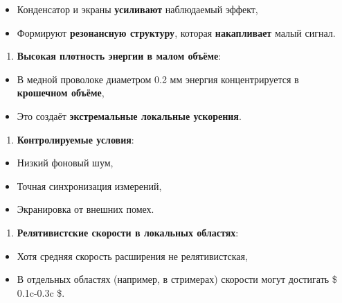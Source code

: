 \documentclass[11pt]{article}
\providecommand{\tightlist}{%
      \setlength{\itemsep}{0pt}\setlength{\parskip}{0pt}}
\begin{document}
\begin{itemize}
\tightlist
\item
  Конденсатор и экраны \textbf{усиливают} наблюдаемый эффект,\\
\item
  Формируют \textbf{резонансную структуру}, которая \textbf{накапливает}
  малый сигнал.
\end{itemize}

\begin{enumerate}
\def\labelenumi{\arabic{enumi}.}
\setcounter{enumi}{1}
\tightlist
\item
  \textbf{Высокая плотность энергии в малом объёме}:\\
\end{enumerate}

\begin{itemize}
\tightlist
\item
  В медной проволоке диаметром 0.2 мм энергия концентрируется в
  \textbf{крошечном объёме},\\
\item
  Это создаёт \textbf{экстремальные локальные ускорения}.
\end{itemize}

\begin{enumerate}
\def\labelenumi{\arabic{enumi}.}
\setcounter{enumi}{2}
\tightlist
\item
  \textbf{Контролируемые условия}:\\
\end{enumerate}

\begin{itemize}
\tightlist
\item
  Низкий фоновый шум,\\
\item
  Точная синхронизация измерений,\\
\item
  Экранировка от внешних помех.
\end{itemize}

\begin{enumerate}
\def\labelenumi{\arabic{enumi}.}
\setcounter{enumi}{3}
\tightlist
\item
  \textbf{Релятивистские скорости в локальных областях}:\\
\end{enumerate}

\begin{itemize}
\tightlist
\item
  Хотя средняя скорость расширения не релятивистская,\\
\item
  В отдельных областях (например, в стримерах) скорости могут достигать
  \$ 0.1c-0.3c \$.
\end{itemize}
\end{document}
